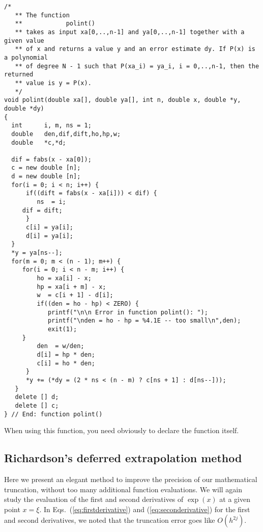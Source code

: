 \begin{lstlisting}[title={\url{http://folk.uio.no/mhjensen/compphys/programs/chapter03/cpp/program4.cpp}}]
   /*
   ** The function
   **            polint()
   ** takes as input xa[0,..,n-1] and ya[0,..,n-1] together with a given value
   ** of x and returns a value y and an error estimate dy. If P(x) is a polynomial
   ** of degree N - 1 such that P(xa_i) = ya_i, i = 0,..,n-1, then the returned 
   ** value is y = P(x). 
   */
void polint(double xa[], double ya[], int n, double x, double *y, double *dy)
{
  int      i, m, ns = 1;
  double   den,dif,dift,ho,hp,w;
  double   *c,*d;
  
  dif = fabs(x - xa[0]);
  c = new double [n];
  d = new double [n];
  for(i = 0; i < n; i++) {
      if((dift = fabs(x - xa[i])) < dif) {
         ns  = i;
	 dif = dift;
      }
      c[i] = ya[i];
      d[i] = ya[i];
  }
  *y = ya[ns--];
  for(m = 0; m < (n - 1); m++) {
     for(i = 0; i < n - m; i++) {
         ho = xa[i] - x;
         hp = xa[i + m] - x;
         w  = c[i + 1] - d[i];
         if((den = ho - hp) < ZERO) {
            printf("\n\n Error in function polint(): ");
            printf("\nden = ho - hp = %4.1E -- too small\n",den);
            exit(1);
	 }
         den  = w/den;
         d[i] = hp * den;
         c[i] = ho * den;
      }
      *y += (*dy = (2 * ns < (n - m) ? c[ns + 1] : d[ns--]));
   }
   delete [] d;
   delete [] c;
} // End: function polint()
\end{lstlisting}
When using this function, you need obviously to declare the function itself.  

\subsection{Richardson's deferred extrapolation method}\label{subsec:rich}

Here we present an elegant method to improve the precision of our mathematical truncation, without
too many additional function evaluations.  We will again study
the evaluation of the first and second derivatives of $\exp{(x)}$ at a given 
point $x=\xi$.
In Eqs.~(\ref{eq:firstderivative}) and (\ref{eq:seconderivative})
for the first and second 
derivatives, 
we noted that
the truncation error goes like $O(h^{2j})$. 

